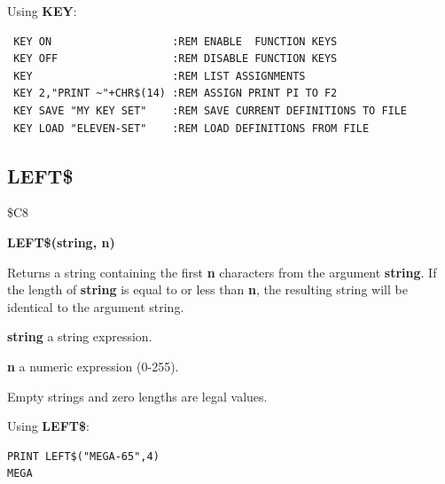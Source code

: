 \begin{description}[leftmargin=2cm,style=nextline]
\item [Examples:] Using {\bf KEY}:
\begin{tcolorbox}[colback=black,coltext=white]
\verbatimfont{\codefont}
\begin{verbatim}
 KEY ON                   :REM ENABLE  FUNCTION KEYS
 KEY OFF                  :REM DISABLE FUNCTION KEYS
 KEY                      :REM LIST ASSIGNMENTS
 KEY 2,"PRINT ~"+CHR$(14) :REM ASSIGN PRINT PI TO F2
 KEY SAVE "MY KEY SET"    :REM SAVE CURRENT DEFINITIONS TO FILE
 KEY LOAD "ELEVEN-SET"    :REM LOAD DEFINITIONS FROM FILE
\end{verbatim}
\end{tcolorbox}
\end{description}


\newpage
\subsection{LEFT\$}
\begin{description}[leftmargin=2cm,style=nextline]
\item [Token:] \$C8
\item [Format:] {\bf LEFT\$(string, n)}
\item [Usage:] Returns a string
               containing the first {\bf n} characters from the
               argument {\bf string}.
               If the length of {\bf string} is equal to or less than {\bf n},
               the resulting string will be identical to the argument string.

               {\bf string} a string expression.

               {\bf n} a numeric expression (0-255).

\item [Remarks:] Empty strings and zero lengths are legal values.

\item [Example:] Using {\bf LEFT\$}:
\begin{tcolorbox}[colback=black,coltext=white]
\verbatimfont{\codefont}
\begin{verbatim}
PRINT LEFT$("MEGA-65",4)
MEGA
\end{verbatim}
\end{tcolorbox}
\end{description}


\newpage
